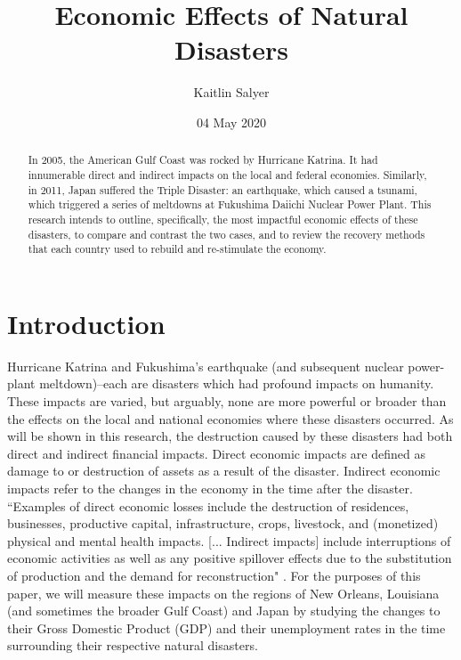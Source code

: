 \documentclass[%
 reprint,
 amsmath,amssymb,
 aps,
]{revtex4-1}
\begin{document}
\title{Economic Effects of Natural Disasters}%

\author{Kaitlin Salyer}

\date{04 May 2020}

\begin{abstract}

In 2005, the American Gulf Coast was rocked by Hurricane Katrina. It had innumerable direct and indirect impacts on the local and federal economies. Similarly, in 2011, Japan suffered the Triple Disaster: an earthquake, which caused a tsunami, which triggered a series of meltdowns at Fukushima Daiichi Nuclear Power Plant. This research intends to outline, specifically, the most impactful economic effects of these disasters, to compare and contrast the two cases, and to review the recovery methods that each country used to rebuild and re-stimulate the economy.

\end{abstract}

\maketitle


\section{\label{sec:level1}Introduction}

Hurricane Katrina and Fukushima's earthquake (and subsequent nuclear power-plant meltdown)--each are disasters which had profound impacts on humanity. These impacts are varied, but arguably, none are more powerful or broader than the effects on the local and national economies where these disasters occurred. As will be shown in this research, the destruction caused by these disasters had both direct and indirect financial impacts. Direct economic impacts are defined as damage to or destruction of assets as a result of the disaster. Indirect economic impacts refer to the changes in the economy in the time after the disaster. ``Examples of direct economic losses include the destruction of residences, businesses, productive capital, infrastructure, crops, livestock, and (monetized) physical and mental health impacts. [... Indirect impacts] include interruptions of economic activities as well as any positive spillover effects due to the substitution of production and the demand for reconstruction" \cite{BotzenPaper}. For the purposes of this paper, we will measure these impacts on the regions of New Orleans, Louisiana (and sometimes the broader Gulf Coast) and Japan by studying the changes to their Gross Domestic Product (GDP) and their unemployment rates in the time surrounding their respective natural disasters.
\end{document}
